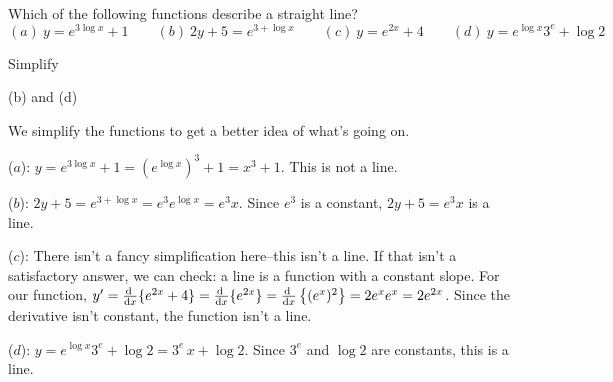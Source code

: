 \begin{Mquestion}
Which of the following functions describe a straight line?
\[(a) ~y=e^{3\log x}+1 \qquad (b) ~2y+5=e^{3+\log x} \qquad (c)~y=e^{2x}+4\qquad (d)~y=e^{\log x}3^e+\log 2\]
\end{Mquestion}
\begin{hint}
Simplify
\end{hint}
\begin{answer}
(b) and (d)
\end{answer}
\begin{solution}
We simplify the functions to get a better idea of what's going on.

($a$): $y=e^{3\log x}+1=\left(e^{\log x}\right)^3+1=x^3+1$. This is not a line.
\smallskip

($b$): $2y+5=e^{3+\log x}=e^3e^{\log x}=e^3x$. Since $e^3$ is a constant, $2y+5=e^3x$ is a line.
\smallskip

($c$): There isn't a fancy simplification here--this isn't a line. If that isn't a satisfactory answer, we can check: a line is a function with a constant slope. For our function,
$y'=\diff{}{x}\{e^{2x} +4\}=\diff{}{x}\{e^{2x}\}=\diff{}{x}\left\{(e^x)^2\right\}=2e^xe^x=2e^{2x}$. Since the derivative isn't constant, the function isn't a line.
\smallskip

($d$): $y=e^{\log x}3^e+\log 2=3^e\,x+\log 2$. Since $3^e$ and $\log 2$ are constants, this is a line.
\end{solution}


